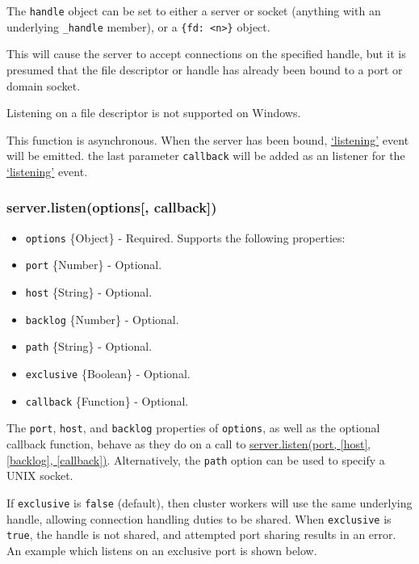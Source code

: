 The \texttt{handle} object can be set to either a server or socket
(anything with an underlying \texttt{\_handle} member), or a
\texttt{\{fd:\ \textless{}n\textgreater{}\}} object.

This will cause the server to accept connections on the specified
handle, but it is presumed that the file descriptor or handle has
already been bound to a port or domain socket.

Listening on a file descriptor is not supported on Windows.

This function is asynchronous. When the server has been bound,
\hyperref[netux5feventux5flistening]{`listening'} event will be emitted.
the last parameter \texttt{callback} will be added as an listener for
the \hyperref[netux5feventux5flistening]{`listening'} event.

\subsubsection{server.listen(options{[},
callback{]})}\label{server.listenoptions-callback}

\begin{itemize}
\itemsep1pt\parskip0pt
\item
  \texttt{options} \{Object\} - Required. Supports the following
  properties:
\item
  \texttt{port} \{Number\} - Optional.
\item
  \texttt{host} \{String\} - Optional.
\item
  \texttt{backlog} \{Number\} - Optional.
\item
  \texttt{path} \{String\} - Optional.
\item
  \texttt{exclusive} \{Boolean\} - Optional.
\item
  \texttt{callback} \{Function\} - Optional.
\end{itemize}

The \texttt{port}, \texttt{host}, and \texttt{backlog} properties of
\texttt{options}, as well as the optional callback function, behave as
they do on a call to
\hyperref[netux5fserverux5flistenux5fportux5fhostux5fbacklogux5fcallback]{server.listen(port,
{[}host{]}, {[}backlog{]}, {[}callback{]})}. Alternatively, the
\texttt{path} option can be used to specify a UNIX socket.

If \texttt{exclusive} is \texttt{false} (default), then cluster workers
will use the same underlying handle, allowing connection handling duties
to be shared. When \texttt{exclusive} is \texttt{true}, the handle is
not shared, and attempted port sharing results in an error. An example
which listens on an exclusive port is shown below.

